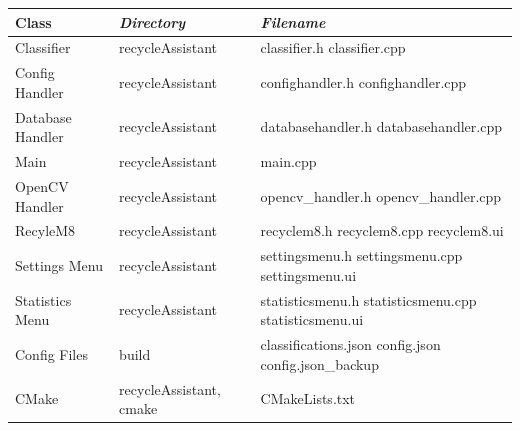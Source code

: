 \documentclass[conference]{IEEEtran}
\begin{document}
\begin{table}[htbp!]\normalsize
\begin{center}
\begin{tabular}{|p{1.5cm}|p{2.2cm}|p{3.9cm}|}
\hline
\textbf{Class} & \textbf{\textit{Directory}}& \textbf{\textit{Filename}}\\
\hline
Classifier & recycleAssistant & classifier.h
\newline
classifier.cpp
\\ \hline
Config Handler & recycleAssistant & confighandler.h
\newline
confighandler.cpp
\newline
\\ \hline
Database Handler & recycleAssistant & databasehandler.h
\newline
databasehandler.cpp
\newline
\\ \hline
Main & recycleAssistant & main.cpp
\newline
\\ \hline
OpenCV Handler & recycleAssistant & opencv\_handler.h
\newline
opencv\_handler.cpp
\newline
\\ \hline
RecyleM8 & recycleAssistant & recyclem8.h
\newline
recyclem8.cpp
\newline
recyclem8.ui
\newline
\\ \hline
Settings Menu & recycleAssistant & settingsmenu.h
\newline
settingsmenu.cpp
\newline
settingsmenu.ui
\newline
\\ \hline
Statistics Menu & recycleAssistant & statisticsmenu.h
\newline
\newline
statisticsmenu.cpp
\newline
\newline
statisticsmenu.ui
\newline
\\ \hline
Config Files & build &
classifications.json
\newline
\newline
config.json
\newline
config.json\_backup
\newline
\\ \hline
CMake & recycleAssistant, cmake & CMakeLists.txt

\end{tabular}
\end{center}
\end{table}
\end{document}
